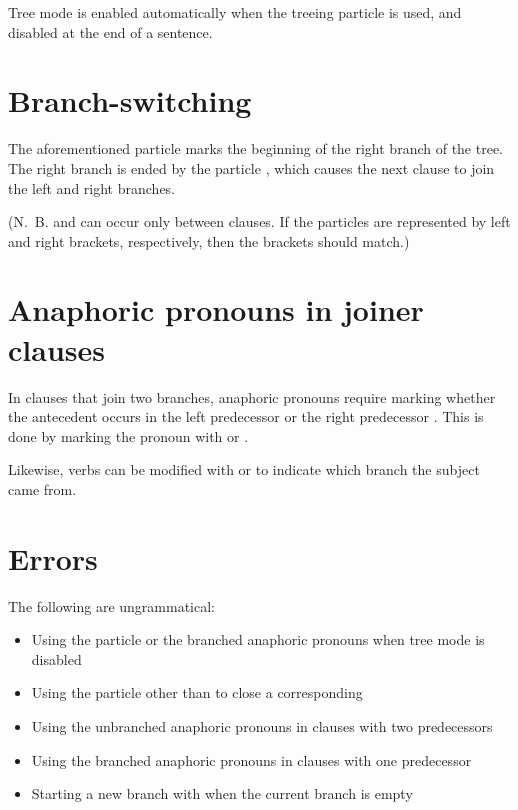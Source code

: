 \documentclass{book}
\begin{document}
Tree mode is enabled automatically when the treeing particle  is used, and disabled at the end of a sentence.

\section{Branch-switching}

The aforementioned particle  marks the beginning of the right branch of the tree. The right branch is ended by the particle , which causes the next clause to join the left and right branches.

(N.~B.  and  can occur only between clauses. If the particles are represented by left and right brackets, respectively, then the brackets should match.)

\section{Anaphoric pronouns in joiner clauses}

In clauses that join two branches, anaphoric pronouns require marking whether the antecedent occurs in the left predecessor  or the right predecessor . This is done by marking the pronoun with  or .

Likewise, verbs can be modified with  or  to indicate which branch the subject came from.

\section{Errors}

The following are ungrammatical:

\begin{itemize}
    \item Using the particle  or the branched anaphoric pronouns when tree mode is disabled
    \item Using the particle  other than to close a corresponding 
    \item Using the unbranched anaphoric pronouns in clauses with two predecessors
    \item Using the branched anaphoric pronouns in clauses with one predecessor
    \item Starting a new branch with  when the current branch is empty
\end{itemize}
\end{document}
